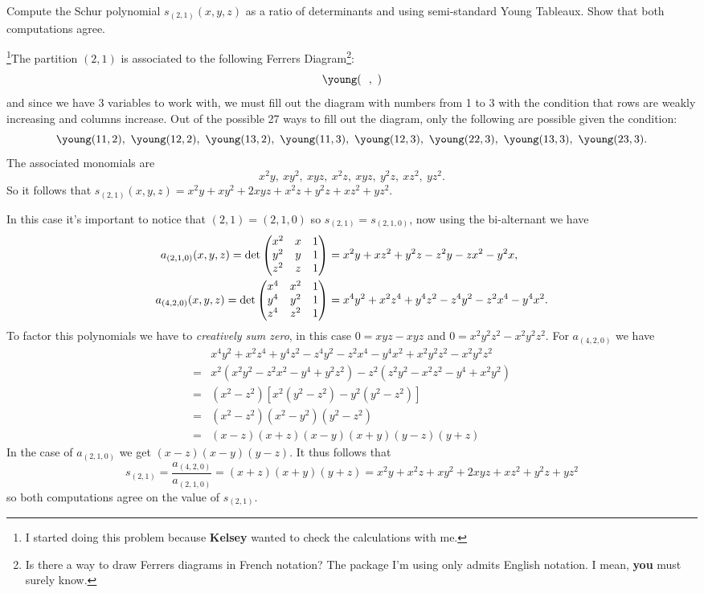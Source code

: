 \documentclass[12pt]{memoir}
\begin{document}
\begin{Ej}[Exercise 5]
    Compute the Schur polynomial $s_{(2,1)}(x,y,z)$ as a ratio of determinants and using semi-standard Young Tableaux. Show that both computations agree.
   \end{Ej}
\begin{ptcbr}
    \footnote{I started doing this problem because \textbf{Kelsey} wanted to check the calculations with me.}The partition $(2,1)$ is associated to the following Ferrers Diagram\footnote{Is there a way to draw Ferrers diagrams in French notation? The package I'm using  only admits English notation. I mean, \textbf{you} must surely know.}:
    $$\young(~~,~)$$
    and since we have 3 variables to work with, we must fill out the diagram with numbers from 1 to 3 with the condition that rows are weakly increasing and columns increase. Out of the possible 27 ways to fill out the diagram, only the following are possible given the condition:
    $$\young(11,2),\ \young(12,2),\ \young(13,2),\ \young(11,3),\ \young(12,3),\ \young(22,3),\ \young(13,3),\ \young(23,3).$$ 
    The associated monomials are 
    $$x^2y,\ xy^2,\ xyz,\ x^2z,\ xyz,\ y^2z,\ xz^2,\ yz^2.$$
    So it follows that $s_{(2,1)}(x,y,z)=x^2y+xy^2+2xyz+x^2z+y^2z+xz^2+yz^2$.\par 
    In this case it's important to notice that $(2,1)=(2,1,0)$ so $s_{(2,1)}=s_{(2,1,0)}$, now using the bi-alternant we have 
\begin{align*}
    a_{(2,1,0)}(x,y,z)=\det\begin{pmatrix} x^2 & x & 1 \\ y^2 & y & 1 \\ z^2 & z & 1 \end{pmatrix}&=x^2y+xz^2+y^2z-z^2y-zx^2-y^2x,\\
    a_{(4,2,0)}(x,y,z)=\det\begin{pmatrix} x^4 & x^2 & 1 \\ y^4 & y^2 & 1 \\ z^4 & z^2 & 1 \end{pmatrix}&=x^4y^2+x^2z^4+y^4z^2-z^4y^2-z^2x^4-y^4x^2.
\end{align*}
To factor this polynomials we have to \emph{creatively sum zero}, in this case $0=xyz-xyz$ and $0=x^2y^2z^2-x^2y^2z^2$. For $a_{(4,2,0)}$ we have
\begin{align*}
    &x^4y^2+x^2z^4+y^4z^2-z^4y^2-z^2x^4-y^4x^2+x^2y^2z^2-x^2y^2z^2\\
    =&x^2(x^2y^2-z^2x^2-y^4+y^2z^2)-z^2(z^2y^2-x^2z^2-y^4+x^2y^2)\\
    =&(x^2-z^2)[x^2(y^2-z^2)-y^2(y^2-z^2)]\\
    =&(x^2-z^2)(x^2-y^2)(y^2-z^2)\\
    =&(x-z)(x+z)(x-y)(x+y)(y-z)(y+z)
\end{align*}
In the case of $a_{(2,1,0)}$ we get $(x-z)(x-y)(y-z)$. It thus follows that 
$$s_{(2,1)}=\frac{a_{(4,2,0)}}{a_{(2,1,0)}}=(x+z)(x+y)(y+z)=x^2 y + x^2 z + x y^2 + 2 x y z + x z^2 + y^2 z + y z^2$$
so both computations agree on the value of $s_{(2,1)}$.
\end{ptcbr}
\end{document}
